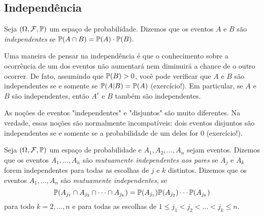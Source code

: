 


\subsection{Independência}

\begin{definition}
Seja $(\Omega,\mathcal F,\mathbb{P})$ um espaço de probabilidade.
Dizemos que os eventos $A$ e $B$ são \emph{independentes}
se
$ \mathbb{P}(A \cap B) = \mathbb{P}(A) \cdot \mathbb{P}(B). $
\end{definition}

Uma maneira de pensar na independência é que o conhecimento sobre a ocorrência de um dos eventos não aumentará nem diminuirá a chance de o outro ocorrer.
De fato, assumindo que $ \mathbb{P}(B)>0 $, você pode verificar que $ A $ e $ B $ são independentes se e somente se $ \mathbb{P}(A|B)=\mathbb{P}(A) $ (exercício!).
Em particular, se $ A $ e $ B $ são independentes, então $ A^c $ e $ B $ também são independentes.

\begin{remark}
As noções de eventos "independentes" e "disjuntos" são muito diferentes.
Na verdade, essas noções são normalmente incompatíveis: dois eventos disjuntos são independentes se e somente se a probabilidade de um deles for $0$ (exercício!).
\end{remark}

\begin{definition}
Seja $(\Omega,\mathcal F,\mathbb{P})$ um espaço de probabilidade e $A_1, A_2, \dots, A_n$ sejam eventos. 
Dizemos que os eventos $A_1, \dots, A_n$ são
\emph{mutuamente independentes aos pares} se $ A_j $ e $ A_k $ forem independentes para todas as escolhas de $ j $ e $ k $ distintos.
Dizemos que os eventos $A_1, \dots, A_n$ são \emph{mutuamente independentes},
se
\[
\mathbb{P}(A_{j_1}\cap A_{j_2} \cap \dots \cap A_{j_k})
=
\mathbb{P}(A_{j_1})
\mathbb{P}(A_{j_2})
\cdots
\mathbb{P}(A_{j_k})
\]
para todo $ k = 2,\dots,n $ e para todas as escolhas de $ 1 \leq j_1<j_2< \dots < j_k\leq n $.
\end{definition}

